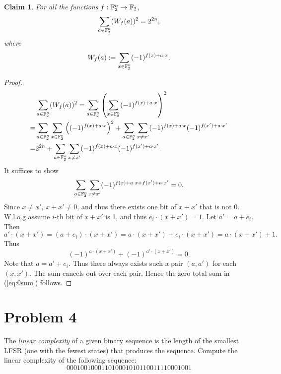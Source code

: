 \documentclass[12pt]{article}
\newtheorem{claim}{Claim}
\theoremstyle{plain}
\begin{document}
\begin{claim}
For all the functions $f : \mathbb{F}_2^n \to \mathbb{F}_2$,
$$\sum_{a \in \mathbb{F}_2^n}(W_f(a))^2 = 2^{2n},$$
where
$$W_f(a) := \sum_{x\in \mathbb{F}_2^n} (-1)^{f(x)+a\cdot x}.$$
\end{claim}
\begin{proof}
$$\begin{aligned}
& \sum_{a \in \mathbb{F}_2^n}(W_f(a))^2 = \sum_{a \in \mathbb{F}_2^n} \left( \sum_{x\in \mathbb{F}_2^n} (-1)^{f(x)+a\cdot x} \right)^2 \\
=& \sum_{a \in \mathbb{F}_2^n} \sum_{x\in \mathbb{F}_2^n} \left( (-1)^{f(x)+a\cdot x} \right)^2 + \sum_{a \in \mathbb{F}_2^n} \sum_{x\not=x'} (-1)^{f(x)+a\cdot x}(-1)^{f(x')+a\cdot x'} \\
=& 2^{2n} + \sum_{a \in \mathbb{F}_2^n} \sum_{x\not=x'} (-1)^{f(x)+a\cdot x}(-1)^{f(x')+a\cdot x'}. \\
\end{aligned}$$
It suffices to show
\begin{equation}
\label{eq:0sum}
\sum_{a \in \mathbb{F}_2^n} \sum_{x\not=x'} (-1)^{f(x)+a\cdot x + f(x')+a\cdot x'} = 0.
\end{equation}
Since $x\not=x'$, $x+x'\not= 0$, and thus there exists one bit of $x+x'$ that is not 0. W.l.o.g assume $i$-th bit of $x+x'$ is 1, and thus $e_i \cdot (x + x') = 1$. Let $a' = a + e_i$. 
Then
$$a'\cdot(x+x') = (a+e_i)\cdot(x+x') = a\cdot(x+x') + e_i\cdot(x+x') = a\cdot(x+x') + 1.$$
Thus
$$(-1)^{a\cdot(x+x')} + (-1)^{a'\cdot(x+x')} = 0.$$
Note that $a = a' + e_i$. Thus there always exists such a pair $(a,a')$ for each $(x,x')$. The sum cancels out over each pair. Hence the zero total sum in (\ref{eq:0sum}) follows.
\end{proof}
%

\section{Problem 4}
The \emph{linear complexity} of a given binary sequence is the length of the
smallest LFSR (one with the fewest states) that produces the sequence.
Compute the linear complexity of the following sequence:
$$000100100011010001010110011110001001$$
\end{document}
